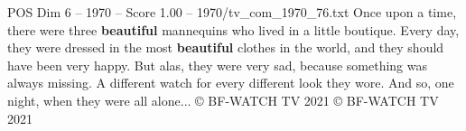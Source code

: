 \begin{textsample}{POS Dim 6 – 1970 – Score 1.00 – 1970/tv\_com\_1970\_76.txt}  \label{ex:f6_pos_038}
Once upon a time, there were three \textbf{beautiful} mannequins who lived in a little boutique.
Every day, they were dressed in the most \textbf{beautiful} clothes in the world, and they should have been very happy.
But alas, they were very sad, because something was always missing.
A different watch for every different look they wore.
And so, one night, when they were all alone... {\EmojiFont ©} BF-WATCH TV 2021 {\EmojiFont ©} BF-WATCH TV 2021

\end{textsample}
